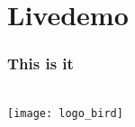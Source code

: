 \documentclass{beamer}
\begin{document}
\section{Livedemo}
\begin{frame}
  \frametitle{This is it}
  \begin{center}
    \href{http://localhost:3000/}{} \\
    \texttt{[image: logo\_bird]}
  \end{center}
\end{frame}
\end{document}
